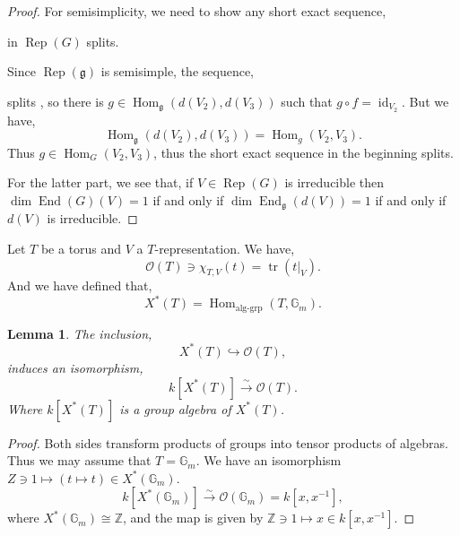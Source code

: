 \documentclass[10pt]{article}
\newtheorem{lemma}{Lemma}[section]
\numberwithin{equation}{theorem}
\DeclareMathOperator{\tr}{tr}
\DeclareMathOperator{\End}{End}
\DeclareMathOperator{\Rep}{Rep}
\DeclareMathOperator{\Hom}{Hom}
\DeclareMathOperator{\id}{id}
\newcommand{\Ouv}[0]{\mathcal{O}}
\newcommand{\Z}[0]{\mathbb{Z}}
\newcommand{\G}[0]{\mathbb{G}}
\newcommand{\g}[0]{\mathfrak{g}}
\begin{document}
\begin{proof}
  For semisimplicity, we need to show any short exact sequence,
  \begin{center}
  \end{center}
  in $\Rep(G)$ splits.
  \par Since $\Rep(\g)$ is semisimple, the sequence,
  \begin{center}
  \end{center}
  splits , so there is $g\in\Hom_\g(d(V_2),d(V_3))$ such that $g\circ f = \id_{V_2}$. But we have,
  \begin{equation*}
    \Hom_\g(d(V_2),d(V_3)) = \Hom_g(V_2,V_3).
  \end{equation*}
  Thus $g\in\Hom_G(V_2,V_3)$, thus the short exact sequence in the beginning splits. 
  \par For the latter part, we see that, if $V\in\Rep(G)$ is irreducible then $\dim\End(G)(V)=1$ if and only if $\dim\End_\g(d(V))=1$ if and only if $d(V)$ is irreducible.
\end{proof}

Let $T$ be a torus and $V$ a $T$-representation. We have,
\begin{equation*}
  \Ouv(T)\ni\chi_{T,V}(t) = \tr(t|_V).
\end{equation*}
And we have defined that,
\begin{equation*}
  X^*(T) = \Hom_{\text{alg-grp}}(T,\G_m).
\end{equation*}

\begin{lemma}
  \label{lemma_5_30}
  The inclusion,
  \begin{equation*}
    X^*(T)\hookrightarrow\Ouv(T),
  \end{equation*}
  induces an isomorphism,
  \begin{equation*}
    k[X^*(T)]\stackrel{\sim}{\to}\Ouv(T).
  \end{equation*}
  Where $k[X^*(T)]$ is a group algebra of $X^*(T)$.
\end{lemma}

\begin{proof}
  Both sides transform products of groups into tensor products of algebras. Thus we may assume that $T=\G_m$. We have an isomorphism $Z\ni1\mapsto(t\mapsto t)\in X^*(\G_m)$.
  \begin{equation*}
    k[X^*(\G_m)]\stackrel{\sim}{\to}\Ouv(\G_m) = k[x,x^{-1}],
  \end{equation*}
  where $X^*(\G_m) \cong \Z$, and the map is given by $\Z\ni1\mapsto x\in k[x,x^{-1}]$.
\end{proof}
\end{document}
